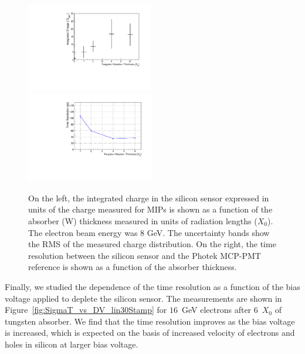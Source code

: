 \documentclass[preprint,1p]{elsarticle}
\begin{document}
\begin{figure}[htbp] 
\centering
\includegraphics[width=0.49\textwidth]{plots/MIPVsAbsorberAt8GeV.pdf} 
\includegraphics[width=0.5\textwidth]{plots/SigmaT_vs_X0_lin30Stamp.pdf} 
\caption{On the left, the integrated charge in the silicon sensor expressed in
units of the charge measured for MIPs is shown as a function of the absorber (W)
thickness measured in units of radiation lengths ($X_{0}$). The electron beam
energy was 8 GeV. The uncertainty bands show the RMS of the measured charge
distribution. On the right, the time resolution between the silicon sensor and
the Photek MCP-PMT reference is shown as a function of the absorber thickness. } 
\label{fig:MIPVsAbsorberAt8GeV} 
\end{figure} 

Finally, we studied the dependence of the time resolution as a function of the
bias voltage applied to deplete the silicon sensor. The measurements are shown
in Figure~\ref{fig:SigmaT_vs_DV_lin30Stamp} for $16$~GeV electrons after
6~$X_0$ of tungsten absorber. We find that the time resolution
improves as the bias voltage is increased, which is expected on the basis of 
increased velocity of electrons and holes in silicon at larger bias voltage. 
\end{document}
